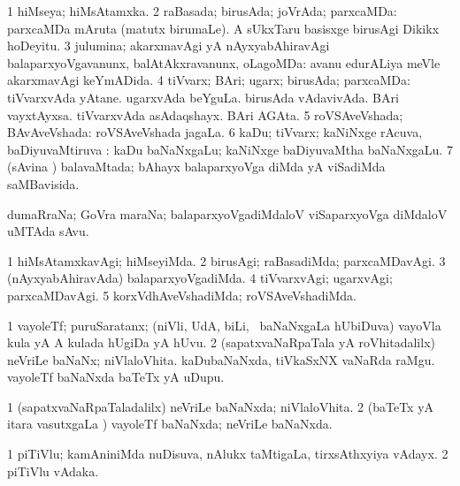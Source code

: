 \bentry
{} 
\gl{\gu}
\expl{}
\bmng
\bnum
\num{1} hiMseya; hiMsAtamxka. 
\num{2} raBasada; birusAda; joVrAda; parxcaMDa:  parxcaMDa mAruta (matutx birumaLe).  A sUkxTaru basisxge birusAgi Dikikx hoDeyitu. 
\num{3} julumina; akarxmavAgi yA nAyxyabAhiravAgi balaparxyoVgavanunx, balAtAkxravanunx, oLagoMDa:  avanu edurALiya meVle akarxmavAgi keYmADida. 
\num{4} tiVvarx; BAri; ugarx; birusAda; parxcaMDa:  tiVvarxvAda yAtane.  ugarxvAda beYguLa.  birusAda vAdavivAda.  BAri vayxtAyxsa.  tiVvarxvAda asAdaqshayx.  BAri AGAta. 
\num{5} roVSAveVshada; BAvAveVshada:  roVSAveVshada jagaLa. 
\num{6} kaDu; tiVvarx; kaNiNxge rAcuva, baDiyuvaMtiruva :  kaDu baNaNxgaLu; kaNiNxge baDiyuvaMtha baNaNxgaLu. 
\num{7} (sAvina \vi) balavaMtada; bAhayx balaparxyoVga diMda yA viSadiMda saMBavisida. 
\enum
\emng
\eentry

\bentry
{}
\gl{\nA}
\expl{}
\bmng
 dumaRraNa; GoVra maraNa; balaparxyoVgadiMdaloV viSaparxyoVga diMdaloV uMTAda sAvu. 
\emng
\eentry

\bentry
{} 
\gl{\kirxvi}
\expl{}
\bmng
\bnum
\num{1} hiMsAtamxkavAgi; hiMseyiMda. 
\num{2} birusAgi; raBasadiMda; parxcaMDavAgi. 
\num{3} (nAyxyabAhiravAda) balaparxyoVgadiMda. 
\num{4} tiVvarxvAgi; ugarxvAgi; parxcaMDavAgi. 
\num{5} korxVdhAveVshadiMda; roVSAveVshadiMda. 
\enum
\emng
\eentry

\bentry
{} 
\gl{\nA}
\expl{}
\bmng
\bnum
\num{1} vayoleTf; puruSaratanx; (niVli, UdA, biLi, \mo\ baNaNxgaLa hUbiDuva) vayoVla kula yA A kulada hUgiDa yA hUvu. 
\num{2} (sapatxvaNaRpaTala yA roVhitadalilx) neVriLe baNaNx; niVlaloVhita. 
\banum
{} kaDubaNaNxda, tiVkaSxNX vaNaRda raMgu. 
 vayoleTf baNaNxda baTeTx yA uDupu. 
\eanum
\numie
\enum
\emng
\eentry

\bentry
{} 
\gl{\gu}
\expl{}
\bmng
\bnum
\num{1} (sapatxvaNaRpaTaladalilx) neVriLe baNaNxda; niVlaloVhita. 
\num{2} (baTeTx yA itara vasutxgaLa \vi) vayoleTf baNaNxda; neVriLe baNaNxda. 
\enum
\emng
\eentry

\bentry
{} 
\gl{\nA}
\expl{}
\bmng
\bnum
\num{1} piTiVlu; kamAniniMda nuDisuva, nAlukx taMtigaLa, tirxsAthxyiya vAdayx.  
\hypertarget{violin(2)}{} 
\num{2} piTiVlu vAdaka. 
\enum
\emng
\eentry

